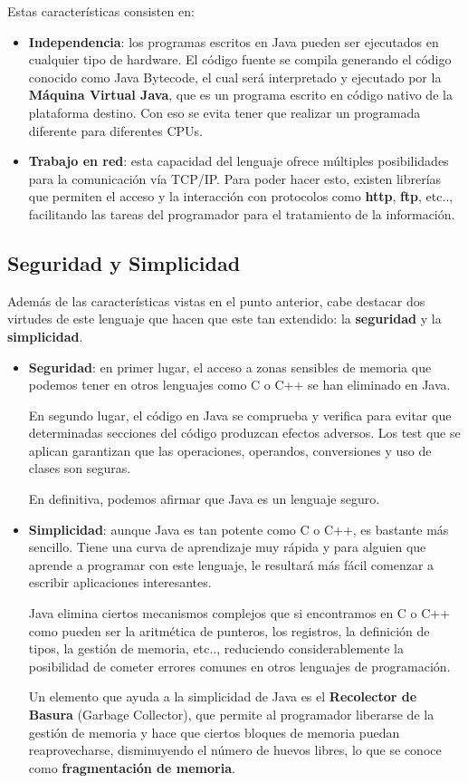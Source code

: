 Estas características consisten en:
\begin{itemize}
    \item \textbf{Independencia}: los programas escritos en Java pueden ser ejecutados en cualquier tipo de hardware. El código fuente se compila generando el código conocido como Java Bytecode, el cual será interpretado y ejecutado por la \textbf{Máquina Virtual Java}, que es un programa escrito en código nativo de la plataforma destino. Con eso se evita tener que realizar un programada diferente para diferentes CPUs.

    \item \textbf{Trabajo en red}: esta capacidad del lenguaje ofrece múltiples posibilidades para la comunicación vía TCP/IP. Para poder hacer esto, existen librerías que permiten el acceso y la interacción con protocolos como \textbf{http}, \textbf{ftp}, etc.., facilitando las tareas del programador para el tratamiento de la información.
\end{itemize}

\subsection{Seguridad y Simplicidad}
Además de las características vistas en el punto anterior, cabe destacar dos virtudes de este lenguaje que hacen que este tan extendido: la \textbf{seguridad} y la \textbf{simplicidad}.

\begin{itemize}
    \item \textbf{Seguridad}: en primer lugar, el acceso a zonas sensibles de memoria que podemos tener en otros lenguajes como C o C++ se han eliminado en Java.

    En segundo lugar, el código en Java se comprueba y verifica para evitar que determinadas secciones del código produzcan efectos adversos. Los test que se aplican garantizan que las operaciones, operandos, conversiones y uso de clases son seguras.

    En definitiva, podemos afirmar que Java es un lenguaje seguro.

    \item \textbf{Simplicidad}: aunque Java es tan potente como C o C++, es bastante más sencillo. Tiene una curva de aprendizaje muy rápida y para alguien que aprende a programar con este lenguaje, le resultará más fácil comenzar a escribir aplicaciones interesantes.

    Java elimina ciertos mecanismos complejos que si encontramos en C o C++ como pueden ser la aritmética de punteros, los registros, la definición de tipos, la gestión de memoria, etc.., reduciendo considerablemente la posibilidad de cometer errores comunes en otros lenguajes de programación.

    Un elemento que ayuda a la simplicidad de Java es el \textbf{Recolector de Basura} (Garbage Collector), que permite al programador liberarse de la gestión de memoria y hace que ciertos bloques de memoria puedan reaprovecharse, disminuyendo el número de huevos libres, lo que se conoce como \textbf{fragmentación de memoria}.
\end{itemize}

